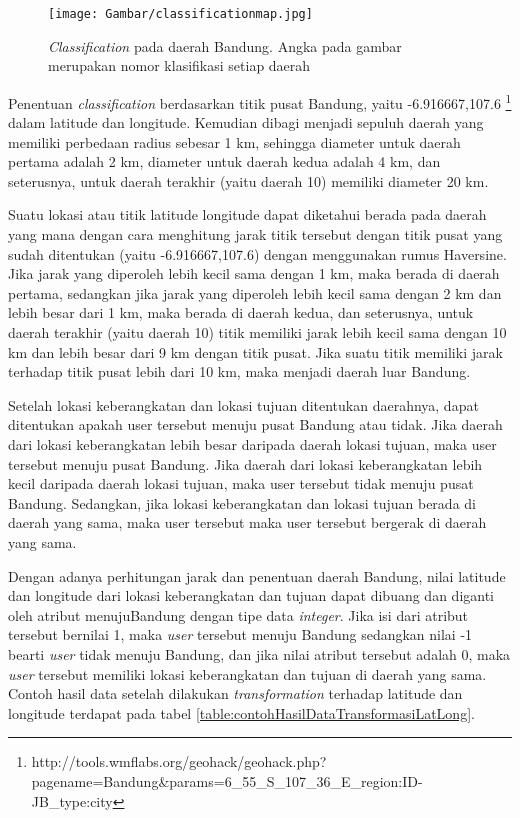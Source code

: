 \begin{figure}
\centering
\texttt{[image: Gambar/classificationmap.jpg]}
\caption[\textsl{Classification} pada daerah Bandung]{\textsl{Classification} pada daerah Bandung. Angka pada gambar merupakan nomor klasifikasi setiap daerah}
\label{fig:classificationMap} 
\end{figure}

Penentuan \textsl{classification} berdasarkan titik pusat Bandung, yaitu -6.916667,107.6 \footnote{http://tools.wmflabs.org/geohack/geohack.php?pagename=Bandung\&params=6\_55\_S\_107\_36\_E\_region:ID-JB\_type:city} dalam latitude dan longitude. Kemudian dibagi menjadi sepuluh daerah yang memiliki perbedaan radius sebesar 1 km, sehingga diameter untuk daerah pertama adalah 2 km, diameter untuk daerah kedua adalah 4 km, dan seterusnya, untuk daerah terakhir (yaitu daerah 10) memiliki diameter 20 km.

Suatu lokasi atau titik latitude longitude dapat diketahui berada pada daerah yang mana dengan cara menghitung jarak titik tersebut dengan titik pusat yang sudah ditentukan (yaitu -6.916667,107.6) dengan menggunakan rumus Haversine. Jika jarak yang diperoleh lebih kecil sama dengan 1 km, maka berada di daerah pertama, sedangkan jika jarak yang diperoleh lebih kecil sama dengan 2 km dan lebih besar dari 1 km, maka berada di daerah kedua, dan seterusnya, untuk daerah terakhir (yaitu daerah 10) titik memiliki jarak lebih kecil sama dengan 10 km dan lebih besar dari 9 km dengan titik pusat. Jika suatu titik memiliki jarak terhadap titik pusat lebih dari 10 km, maka menjadi daerah luar Bandung.

Setelah lokasi keberangkatan dan lokasi tujuan ditentukan daerahnya, dapat ditentukan apakah user tersebut menuju pusat Bandung atau tidak. Jika daerah dari lokasi keberangkatan lebih besar daripada daerah lokasi tujuan, maka user tersebut menuju pusat Bandung. Jika daerah dari lokasi keberangkatan lebih kecil daripada daerah lokasi tujuan, maka user tersebut tidak menuju pusat Bandung. Sedangkan, jika lokasi keberangkatan dan lokasi tujuan berada di daerah yang sama, maka user tersebut maka user tersebut bergerak di daerah yang sama.

Dengan adanya perhitungan jarak dan penentuan daerah Bandung, nilai latitude dan longitude dari lokasi keberangkatan dan tujuan dapat dibuang dan diganti oleh atribut menujuBandung dengan tipe data \textsl{integer}. Jika isi dari atribut tersebut bernilai 1, maka \textsl{user} tersebut menuju Bandung sedangkan nilai -1 bearti \textsl{user} tidak menuju Bandung, dan jika nilai atribut tersebut adalah 0, maka \textsl{user} tersebut memiliki lokasi keberangkatan dan tujuan di daerah yang sama. Contoh hasil data setelah dilakukan \textsl{transformation} terhadap latitude dan longitude terdapat pada tabel \ref{table:contohHasilDataTransformasiLatLong}.

